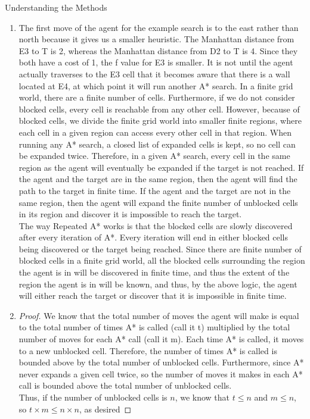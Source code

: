 \documentclass[12pt]{article}
\theoremstyle{definition}
\begin{document}
\begin{onehalfspacing}
\begin{section}{Understanding the Methods}
\begin{enumerate}
    \item The first move of the agent for the example search is to the east rather than north because it gives us a smaller heuristic. The Manhattan distance from E3 to T is 2, whereas the Manhattan distance from D2 to T is 4. Since they both have a cost of 1, the f value for E3 is smaller. It is not until the agent actually traverses to the E3 cell that it becomes aware that there is a wall located at E4, at which point it will run another A* search.
    In a finite grid world, there are a finite number of cells. Furthermore, if we do not consider blocked cells, every cell is reachable from any other cell. However, because of blocked cells, we divide the finite grid world into smaller finite regions, where each cell in a given region can access every other cell in that region. When running any A* search, a closed list of expanded cells is kept, so no cell can be expanded twice. Therefore, in a given A* search, every cell in the same region as the agent will eventually be expanded if the target is not reached. If the agent and the target are in the same region, then the agent will find the path to the target in finite time. If the agent and the target are not in the same region, then the agent will expand the finite number of unblocked cells in its region and discover it is impossible to reach the target.\\[1em]
    The way Repeated A* works is that the blocked cells are slowly discovered after every iteration of A*. Every iteration will end in either blocked cells being discovered or the target being reached. Since there are finite number of blocked cells in a finite grid world, all the blocked cells surrounding the region the agent is in will be discovered in finite time, and thus the extent of the region the agent is in will be known, and thus, by the above logic, the agent will either reach the target or discover that it is impossible in finite time.
        

    \item \begin{proof}
    We know that the total number of moves the agent will make is equal to the total number of times A* is called (call it t) multiplied by the total number of moves for each A* call (call it m). Each time A* is called, it moves to a new unblocked cell. Therefore, the number of times A* is called is bounded above by the total number of unblocked cells. Furthermore, since A* never expands a given cell twice, so the number of moves it makes in each A* call is bounded above the total number of unblocked cells. \\[0.5em]
    Thus, if the number of unblocked cells is $n$, we know that $t\leq n$ and $m\leq n$, so $t\times m \leq n\times n$, as desired
    \end{proof}
    


\end{enumerate}
\end{section}
\end{onehalfspacing}
\end{document}
